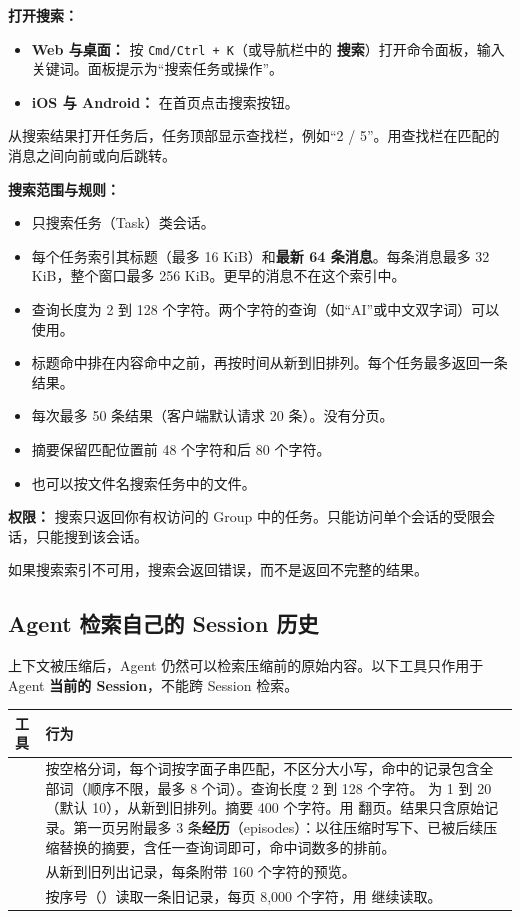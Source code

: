 \documentclass[UTF8,a4paper,11pt]{ctexart}
\begin{document}
\textbf{打开搜索：}

\begin{itemize}
  \item \textbf{Web 与桌面：} 按 \texttt{Cmd/Ctrl + K}（或导航栏中的 \textbf{搜索}）打开命令面板，输入关键词。面板提示为“搜索任务或操作”。
  \item \textbf{iOS 与 Android：} 在首页点击搜索按钮。
\end{itemize}

从搜索结果打开任务后，任务顶部显示查找栏，例如“2 / 5”。用查找栏在匹配的消息之间向前或向后跳转。

\textbf{搜索范围与规则：}

\begin{itemize}
  \item 只搜索任务（Task）类会话。
  \item 每个任务索引其标题（最多 16 KiB）和\textbf{最新 64 条消息}。每条消息最多 32 KiB，整个窗口最多 256 KiB。更早的消息不在这个索引中。
  \item 查询长度为 2 到 128 个字符。两个字符的查询（如“AI”或中文双字词）可以使用。
  \item 标题命中排在内容命中之前，再按时间从新到旧排列。每个任务最多返回一条结果。
  \item 每次最多 50 条结果（客户端默认请求 20 条）。没有分页。
  \item 摘要保留匹配位置前 48 个字符和后 80 个字符。
  \item 也可以按文件名搜索任务中的文件。
\end{itemize}

\textbf{权限：} 搜索只返回你有权访问的 Group 中的任务。只能访问单个会话的受限会话，只能搜到该会话。

\begin{note}
如果搜索索引不可用，搜索会返回错误，而不是返回不完整的结果。
\end{note}

\subsection{Agent 检索自己的 Session 历史}

上下文被压缩后，Agent 仍然可以检索压缩前的原始内容。以下工具只作用于 Agent \textbf{当前的 Session}，不能跨 Session 检索。

\begin{longtable}{P{3.0cm}P{10.8cm}}
\toprule
工具 & 行为 \\
\midrule
\endhead
{} & 按空格分词，每个词按字面子串匹配，不区分大小写，命中的记录包含全部词（顺序不限，最多 8 个词）。查询长度 2 到 128 个字符。 为 1 到 20（默认 10），从新到旧排列。摘要 400 个字符。用  翻页。结果只含原始记录。第一页另附最多 3 条\textbf{经历}（episodes）：以往压缩时写下、已被后续压缩替换的摘要，含任一查询词即可，命中词数多的排前。 \\
 & 从新到旧列出记录，每条附带 160 个字符的预览。 \\
 & 按序号（）读取一条旧记录，每页 8,000 个字符，用  继续读取。 \\
\bottomrule
\end{longtable}
\end{document}
